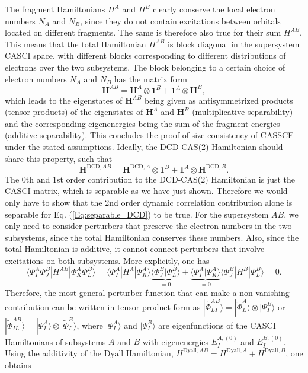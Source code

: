 The fragment Hamiltonians ${H^A}$ and ${H^B}$ clearly conserve the local electron numbers $N_A^{}$ and $N_B^{}$, since they do not contain excitations between orbitals located on different fragments. The same is therefore also true for their sum $H^{AB}$. This means that the total Hamiltonian ${H^{AB}}$ is block diagonal in the supersystem CASCI space, with different blocks corresponding to different distributions of electrons over the two subsystems. The block belonging to a certain choice of electron numbers $N_A^{}$ and $N_B^{}$ has the matrix form
	\begin{equation}
	{{\mathbf{H}}^{AB}} = {{\mathbf{H}}^A} \otimes {{\mathbf{1}}^B} + {{\mathbf{1}}^A} \otimes {{\mathbf{H}}^B},
	\end{equation}								
which leads to the eigenstates of $\mathbf{H}^{AB}$ being given as antisymmetrized products (tensor products) of the eigenstates of $\mathbf{H}^A$ and $\mathbf{H}^B$ (multiplicative separability) and the corresponding eigenenergies being the sum of the fragment energies (additive separability).\cite{Mayer_2003_, HelgaJO_2000_} This concludes the proof of size consistency of CASSCF under the stated assumptions.
Ideally, the DCD-CAS(2) Hamiltonian should share this property, such that	
\begin{equation}
\label{Eq:separable_DCD}
{{\mathbf{H}}^{{\text{DCD}},AB}} = {{\mathbf{H}}^{{\text{DCD}},A}} \otimes {{\mathbf{1}}^B} + {{\mathbf{1}}^A} \otimes {{\mathbf{H}}^{{\text{DCD}},B}}.
\end{equation}						
The 0th and 1st order contribution to the DCD-CAS(2) Hamiltonian is just the CASCI matrix, which is separable as we have just shown. Therefore we would only have to show that the 2nd order dynamic correlation contribution alone is separable for Eq. (\ref{Eq:separable_DCD}) to be true. For the supersystem $AB$, we only need to consider perturbers that preserve the electron numbers in the two subsystems, since the total Hamiltonian conserves these numbers. Also, since the total Hamiltonian is additive, it cannot connect perturbers that involve excitations on both subsystems. More explicitly, one has
\begin{equation}
\langle \Phi_I^A \Phi_J^B| H^{AB} | \Phi_K^A \Phi_L^B\rangle = \langle \Phi_I^A|H^A|\Phi_K^A\rangle \underbrace{\langle \Phi_J^B|\Phi_L^B\rangle}_{=0} + \underbrace{\langle \Phi_I^A|\Phi_K^A\rangle}_{=0}\langle \Phi_J^B|H^B|\Phi_L^B\rangle = 0.
\end{equation}
Therefore, the most general perturber function that can make a non-vanishing contribution can be written in tensor product form as $| {\tilde \Phi _{LI}^{AB}} \rangle  = | {\tilde \Phi _L^A} \rangle  \otimes | {\Psi _I^B} \rangle $ or $| {\tilde \Phi _{IL}^{AB}} \rangle  = | {\Psi _I^A} \rangle  \otimes | {\tilde \Phi _L^B} \rangle $, where $| {\Psi _I^A} \rangle $ and $| {\Psi _I^B} \rangle $  are eigenfunctions of the CASCI Hamiltonians of subsystems $A$ and $B$ with eigenenergies $E_I^{A,(0)}$ and $E_I^{B,(0)}$. Using the additivity of the Dyall Hamiltonian, $H^{\text{Dyall},AB}=H^{\text{Dyall},A}+H^{\text{Dyall},B}$, one obtains 

